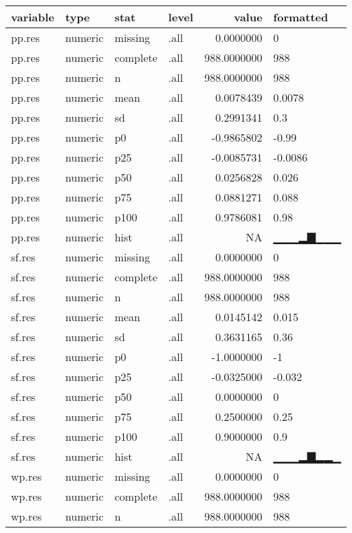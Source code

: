 \documentclass[]{article}
\begin{document}
\begin{tabular}{l|l|l|l|r|l}
\hline
variable & type & stat & level & value & formatted\\
\hline
pp.res & numeric & missing & .all & 0.0000000 & 0\\
\hline
pp.res & numeric & complete & .all & 988.0000000 & 988\\
\hline
pp.res & numeric & n & .all & 988.0000000 & 988\\
\hline
pp.res & numeric & mean & .all & 0.0078439 & 0.0078\\
\hline
pp.res & numeric & sd & .all & 0.2991341 & 0.3\\
\hline
pp.res & numeric & p0 & .all & -0.9865802 & -0.99\\
\hline
pp.res & numeric & p25 & .all & -0.0085731 & -0.0086\\
\hline
pp.res & numeric & p50 & .all & 0.0256828 & 0.026\\
\hline
pp.res & numeric & p75 & .all & 0.0881271 & 0.088\\
\hline
pp.res & numeric & p100 & .all & 0.9786081 & 0.98\\
\hline
pp.res & numeric & hist & .all & NA & ▁▁▁▂▇▁▁▁\\
\hline
sf.res & numeric & missing & .all & 0.0000000 & 0\\
\hline
sf.res & numeric & complete & .all & 988.0000000 & 988\\
\hline
sf.res & numeric & n & .all & 988.0000000 & 988\\
\hline
sf.res & numeric & mean & .all & 0.0145142 & 0.015\\
\hline
sf.res & numeric & sd & .all & 0.3631165 & 0.36\\
\hline
sf.res & numeric & p0 & .all & -1.0000000 & -1\\
\hline
sf.res & numeric & p25 & .all & -0.0325000 & -0.032\\
\hline
sf.res & numeric & p50 & .all & 0.0000000 & 0\\
\hline
sf.res & numeric & p75 & .all & 0.2500000 & 0.25\\
\hline
sf.res & numeric & p100 & .all & 0.9000000 & 0.9\\
\hline
sf.res & numeric & hist & .all & NA & ▁▁▁▂▇▂▂▁\\
\hline
wp.res & numeric & missing & .all & 0.0000000 & 0\\
\hline
wp.res & numeric & complete & .all & 988.0000000 & 988\\
\hline
wp.res & numeric & n & .all & 988.0000000 & 988\\

\end{tabular}
\end{document}
